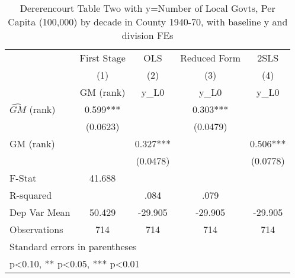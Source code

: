 \begin{table}[htbp]\centering
\def\sym#1{\ifmmode^{#1}\else\(^{#1}\)\fi}
\caption{Dererencourt Table Two with y=Number of Local Govts, Per Capita (100,000) by decade in County 1940-70, with baseline y and division FEs}
\begin{tabular}{l*{4}{c}}
\toprule
                    & First Stage   &         OLS   &Reduced Form   &        2SLS   \\
                    &\multicolumn{1}{c}{(1)}&\multicolumn{1}{c}{(2)}&\multicolumn{1}{c}{(3)}&\multicolumn{1}{c}{(4)}\\
                    &\multicolumn{1}{c}{GM  (rank)}&\multicolumn{1}{c}{y\_L0}&\multicolumn{1}{c}{y\_L0}&\multicolumn{1}{c}{y\_L0}\\
\midrule
$\hat{GM}$ (rank)   &       0.599***&               &       0.303***&               \\
                    &    (0.0623)   &               &    (0.0479)   &               \\
\addlinespace
GM  (rank)          &               &       0.327***&               &       0.506***\\
                    &               &    (0.0478)   &               &    (0.0778)   \\
\midrule
F-Stat              &      41.688   &               &               &               \\
R-squared           &               &        .084   &        .079   &               \\
Dep Var Mean        &      50.429   &     -29.905   &     -29.905   &     -29.905   \\
Observations        &         714   &         714   &         714   &         714   \\
\bottomrule
\multicolumn{5}{l}{\footnotesize Standard errors in parentheses}\\
\multicolumn{5}{l}{\footnotesize * p<0.10, ** p<0.05, *** p<0.01}\\
\end{tabular}
\end{table}
